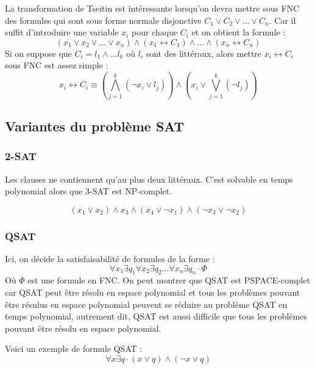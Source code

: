 La transformation de Tseitin est intéressante lorsqu'on devra mettre sous FNC des formules qui sont sous forme normale disjonctive $C_1\vee C_2\vee\dots\vee C_n$. Car il suffit d'introduire une variable $x_i$ pour chaque $C_i$ et on obtient la formule :
\begin{equation*}
    (x_1\vee x_2\vee\dots\vee x_n)\wedge(x_1\leftrightarrow C_1)\wedge\dots\wedge(x_n \leftrightarrow C_n)
\end{equation*} 
Si on suppose que $C_i = l_1\wedge\dots l_k$ où $l_i$ sont des littéraux, alors mettre $x_i\leftrightarrow C_i$ sous FNC est assez simple :
\begin{equation*}
    x_i \leftrightarrow C_i \equiv (\bigwedge_{j=1}^{k}(\neg x_i \vee l_j)) \wedge (x_i \vee \bigvee_{j=1}^{k}(\neg l_j))
\end{equation*}



\subsection{Variantes du problème SAT}
\subsubsection{2-SAT}
Les clauses ne contiennent qu'au plus deux littéraux. C'est solvable en temps polynomial alors que 3-SAT est NP-complet.
\begin{example}
    \begin{equation*}
        (x_1\vee x_2)\wedge x_3\wedge (x_4\vee\neg x_1) \wedge (\neg x_3 \vee\neg x_2)
    \end{equation*}
\end{example}

\subsubsection{QSAT}
Ici, on décide la satisfaisabilité de formules de la forme :
\begin{equation*}
    \forall x_1 \exists q_1\forall x_2\exists q_2\dots\forall x_n\exists q_n\cdot \Phi
\end{equation*}
Où $\Phi$ est une formule en FNC. On peut montrer que QSAT est PSPACE-complet car QSAT peut être résolu en espace polynomial et tous
les problèmes pouvant être résulus en espace polynomial peuvent se réduire au problème QSAT en temps polynomial, autrement dit, 
QSAT est aussi difficile que tous les problèmes pouvant être résolu en espace polynomial.
\begin{example}
    Voici un exemple de formule QSAT :
    \begin{equation*}
        \forall x\exists q\cdot (x\vee q)\wedge(\neg x \vee q)
    \end{equation*}
\end{example}

